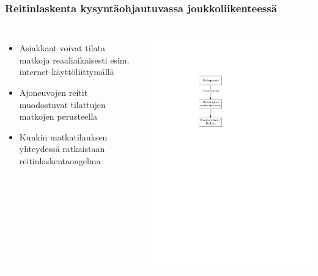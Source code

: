 \documentclass{beamer}
\begin{document}
\begin{frame}
  \frametitle{Reitinlaskenta kysyntäohjautuvassa joukkoliikenteessä}   %
  \begin{columns}[c]
  \column{3.5in}  %
  \begin{itemize}
    \item
    Asiakkaat voivat tilata matkoja reaaliaikaisesti esim. internet-käyttöliittymällä
    \item
    Ajoneuvojen reitit muodostuvat tilattujen matkojen perusteella
    \item
    Kunkin matkatilauksen yhteydessä ratkaistaan reitinlaskentaongelma
  \end{itemize}
    \column{1.5in}
\centering

\includegraphics[scale=0.8]{tilauskaavio02}
 
  \end{columns}
\end{frame}
\end{document}
